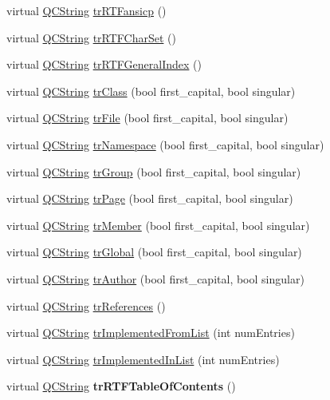 \begin{DoxyCompactItemize}
\item 
virtual \hyperlink{class_q_c_string}{Q\-C\-String} \hyperlink{class_translator_dutch_ac711f1a109c3c8131bf02a9ff6f48e36}{tr\-R\-T\-Fansicp} ()
\item 
virtual \hyperlink{class_q_c_string}{Q\-C\-String} \hyperlink{class_translator_dutch_af3bba50fd4e382b113171e132e88719b}{tr\-R\-T\-F\-Char\-Set} ()
\item 
virtual \hyperlink{class_q_c_string}{Q\-C\-String} \hyperlink{class_translator_dutch_a6a04ffa0f1114981e258cf0a94478c98}{tr\-R\-T\-F\-General\-Index} ()
\item 
virtual \hyperlink{class_q_c_string}{Q\-C\-String} \hyperlink{class_translator_dutch_a2b5bc0be4e846d4ee6e3430ddeb3cf53}{tr\-Class} (bool first\-\_\-capital, bool singular)
\item 
virtual \hyperlink{class_q_c_string}{Q\-C\-String} \hyperlink{class_translator_dutch_abb09819793310c18e4b39a4691b8e681}{tr\-File} (bool first\-\_\-capital, bool singular)
\item 
virtual \hyperlink{class_q_c_string}{Q\-C\-String} \hyperlink{class_translator_dutch_a5e5011ab1245fd64707347dae129c574}{tr\-Namespace} (bool first\-\_\-capital, bool singular)
\item 
virtual \hyperlink{class_q_c_string}{Q\-C\-String} \hyperlink{class_translator_dutch_a2825eb7956ddf759028c8957352e627d}{tr\-Group} (bool first\-\_\-capital, bool singular)
\item 
virtual \hyperlink{class_q_c_string}{Q\-C\-String} \hyperlink{class_translator_dutch_a719e433b483932299fd17e751decdfb2}{tr\-Page} (bool first\-\_\-capital, bool singular)
\item 
virtual \hyperlink{class_q_c_string}{Q\-C\-String} \hyperlink{class_translator_dutch_aaded5c915d8cd335abcd0e65e535cd71}{tr\-Member} (bool first\-\_\-capital, bool singular)
\item 
virtual \hyperlink{class_q_c_string}{Q\-C\-String} \hyperlink{class_translator_dutch_ac9f8f800abe2f721d9cf0bdfc9b6ec6f}{tr\-Global} (bool first\-\_\-capital, bool singular)
\item 
virtual \hyperlink{class_q_c_string}{Q\-C\-String} \hyperlink{class_translator_dutch_a8ce93b65c315fc4e942a1dc4cc80fa54}{tr\-Author} (bool first\-\_\-capital, bool singular)
\item 
virtual \hyperlink{class_q_c_string}{Q\-C\-String} \hyperlink{class_translator_dutch_a54eaa9a933568bfd7eaffe36b7872eb0}{tr\-References} ()
\item 
virtual \hyperlink{class_q_c_string}{Q\-C\-String} \hyperlink{class_translator_dutch_a01f548ba9f63fd42bc070ba1247e6543}{tr\-Implemented\-From\-List} (int num\-Entries)
\item 
virtual \hyperlink{class_q_c_string}{Q\-C\-String} \hyperlink{class_translator_dutch_aa2aa7d2d195ce999a256e7769605c0f0}{tr\-Implemented\-In\-List} (int num\-Entries)
\item 
\hypertarget{class_translator_dutch_aacd8ff5b2dcf79f4e8e72625d624a206}{virtual \hyperlink{class_q_c_string}{Q\-C\-String} {\bfseries tr\-R\-T\-F\-Table\-Of\-Contents} ()}\label{class_translator_dutch_aacd8ff5b2dcf79f4e8e72625d624a206}


\end{DoxyCompactItemize}
